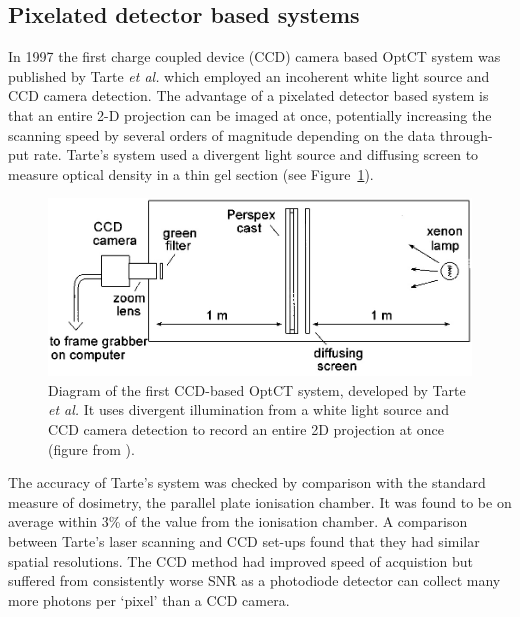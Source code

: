 \documentclass[12pt]{article}
\begin{document}
\subsection{Pixelated detector based systems}

In 1997 the first charge coupled device (CCD) camera based OptCT system was published by Tarte \textit{et al.} which employed an incoherent white light source and CCD camera detection. \cite{Tarte:2007} The advantage  of a pixelated detector based system  is that an entire 2-D projection can be imaged at once, potentially increasing the scanning speed by several  orders of magnitude depending on the data through-put rate. Tarte's system used a divergent light source and diffusing screen to measure optical density in a thin gel section (see Figure~\ref{fig:tarte_ccd_setup}). 

\begin{figure}[H]
\centering
\includegraphics[scale=0.4]{Tarte_1997_ccdsetup.jpg}
\caption{Diagram of the first CCD-based  OptCT system, developed by Tarte \textit{et al.} It uses  divergent illumination from a white light source and CCD camera detection to record an entire 2D projection at once   (figure from \cite{Tarte:2007}). }
\label{fig:tarte_ccd_setup}
\end{figure}


The accuracy of Tarte's system  was checked by comparison with the standard measure of dosimetry, the parallel plate ionisation chamber. It was found to be on average within 3\% of the value from the ionisation chamber. \cite{Tarte:2007} A comparison between Tarte's laser scanning and CCD set-ups found that they had similar spatial resolutions. The CCD method had improved speed of acquistion but suffered from consistently worse SNR as a photodiode detector can collect many more photons per `pixel' than a CCD camera. \cite{Tarte:2007}
\end{document}
